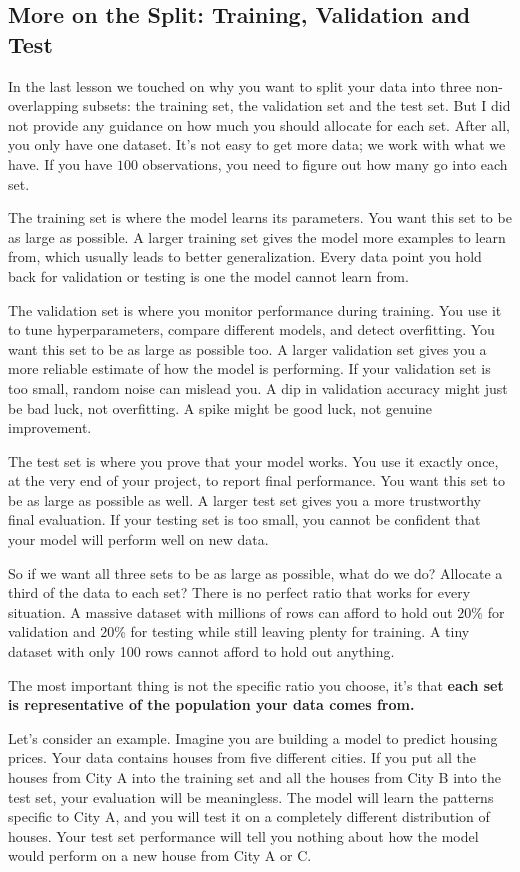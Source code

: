 \subsection*{More on the Split: Training, Validation and Test}
In the last lesson we touched on why you want to split your data into three non-overlapping subsets: the training set, the validation set and the test set. But I did not provide any guidance on how much you should allocate for each set. After all, you only have one dataset. It's not easy to get more data; we work with what we have. If you have $100$ observations, you need to figure out how many go into each set.

The training set is where the model learns its parameters. You want this set to be as large as possible. A larger training set gives the model more examples to learn from, which usually leads to better generalization. Every data point you hold back for validation or testing is one the model cannot learn from.

The validation set is where you monitor performance during training. You use it to tune hyperparameters, compare different models, and detect overfitting. You want this set to be as large as possible too. A larger validation set gives you a more reliable estimate of how the model is performing. If your validation set is too small, random noise can mislead you. A dip in validation accuracy might just be bad luck, not overfitting. A spike might be good luck, not genuine improvement.

The test set is where you prove that your model works. You use it exactly once, at the very end of your project, to report final performance. You want this set to be as large as possible as well. A larger test set gives you a more trustworthy final evaluation. If your testing set is too small, you cannot be confident that your model will perform well on new data.

So if we want all three sets to be as large as possible, what do we do? Allocate a third of the data to each set? There is no perfect ratio that works for every situation. A massive dataset with millions of rows can afford to hold out $20\%$ for validation and $20\%$ for testing while still leaving plenty for training. A tiny dataset with only 100 rows cannot afford to hold out anything.

The most important thing is not the specific ratio you choose, it's that \textbf{each set is representative of the population your data comes from.}

Let's consider an example. Imagine you are building a model to predict housing prices. Your data contains houses from five different cities. If you put all the houses from City A into the training set and all the houses from City B into the test set, your evaluation will be meaningless. The model will learn the patterns specific to City A, and you will test it on a completely different distribution of houses. Your test set performance will tell you nothing about how the model would perform on a new house from City A or C.

